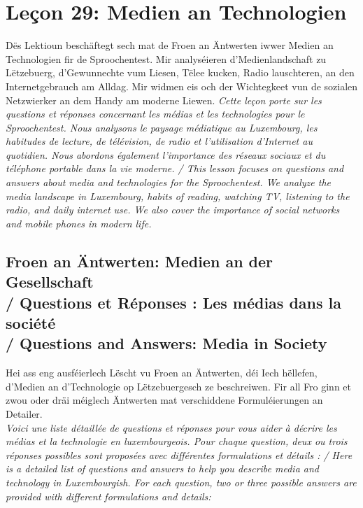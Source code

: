 \chapter{Leçon 29: Medien an Technologien}

Dës Lektioun beschäftegt sech mat de Froen an Äntwerten iwwer Medien an Technologien fir de Sproochentest. Mir analyséieren d'Medienlandschaft zu Lëtzebuerg, d'Gewunnechte vum Liesen, Tëlee kucken, Radio lauschteren, an den Internetgebrauch am Alldag. Mir widmen eis och der Wichtegkeet vun de sozialen Netzwierker an dem Handy am moderne Liewen. \textit{Cette leçon porte sur les questions et réponses concernant les médias et les technologies pour le Sproochentest. Nous analysons le paysage médiatique au Luxembourg, les habitudes de lecture, de télévision, de radio et l'utilisation d'Internet au quotidien. Nous abordons également l'importance des réseaux sociaux et du téléphone portable dans la vie moderne. / This lesson focuses on questions and answers about media and technologies for the Sproochentest. We analyze the media landscape in Luxembourg, habits of reading, watching TV, listening to the radio, and daily internet use. We also cover the importance of social networks and mobile phones in modern life.}

\vspace{1em}

\section[Froen an Äntwerten / Questions / Q\&A (Medien)]{Froen an Äntwerten: Medien an der Gesellschaft \\/ Questions et Réponses : Les médias dans la société \\/ Questions and Answers: Media in Society}

Hei ass eng ausféierlech Lëscht vu Froen an Äntwerten, déi Iech hëllefen, d'Medien an d'Technologie op Lëtzebuergesch ze beschreiwen. Fir all Fro ginn et zwou oder dräi méiglech Äntwerten mat verschiddene Formuléierungen an Detailer. \\
\textit{Voici une liste détaillée de questions et réponses pour vous aider à décrire les médias et la technologie en luxembourgeois. Pour chaque question, deux ou trois réponses possibles sont proposées avec différentes formulations et détails : / Here is a detailed list of questions and answers to help you describe media and technology in Luxembourgish. For each question, two or three possible answers are provided with different formulations and details:}

